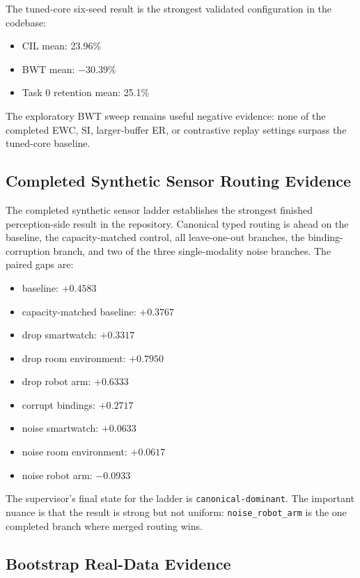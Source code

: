 \documentclass{article}
\begin{document}
The tuned-core six-seed result is the strongest validated configuration in the codebase:
\begin{itemize}[leftmargin=*]
  \item CIL mean: 23.96\%
  \item BWT mean: $-30.39\%$
  \item Task 0 retention mean: 25.1\%
\end{itemize}
The exploratory BWT sweep remains useful negative evidence: none of the completed EWC, SI, larger-buffer ER, or contrastive replay settings surpass the tuned-core baseline.

\subsection{Completed Synthetic Sensor Routing Evidence}

The completed synthetic sensor ladder establishes the strongest finished perception-side result in the repository. Canonical typed routing is ahead on the baseline, the capacity-matched control, all leave-one-out branches, the binding-corruption branch, and two of the three single-modality noise branches. The paired gaps are:
\begin{itemize}[leftmargin=*]
  \item baseline: $+0.4583$
  \item capacity-matched baseline: $+0.3767$
  \item drop smartwatch: $+0.3317$
  \item drop room environment: $+0.7950$
  \item drop robot arm: $+0.6333$
  \item corrupt bindings: $+0.2717$
  \item noise smartwatch: $+0.0633$
  \item noise room environment: $+0.0617$
  \item noise robot arm: $-0.0933$
\end{itemize}
The supervisor's final state for the ladder is \texttt{canonical-dominant}. The important nuance is that the result is strong but not uniform: \texttt{noise\_robot\_arm} is the one completed branch where merged routing wins.

\subsection{Bootstrap Real-Data Evidence}
\end{document}
